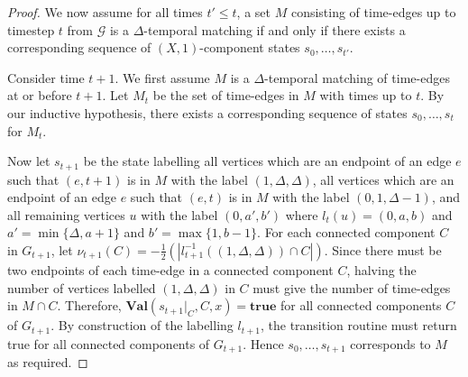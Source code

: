 \documentclass[a4paper,UKenglish,cleveref, autoref, thm-restate]{lipics-v2021} %
\begin{document}
\begin{toappendix}
\begin{proof}
    We now assume for all times $t'\leq t$, a set $M$ consisting of time-edges up to timestep $t$ from $\mathcal{G}$ is a $\Delta$-temporal matching if and only if there exists a corresponding sequence of $(X,1)$-component states $s_0, \ldots, s_{t'}$.

    Consider time $t+1$. We first assume $M$ is a $\Delta$-temporal matching of time-edges at or before $t+1$. Let $M_{t}$ be the set of time-edges in $M$ with times up to $t$. By our inductive hypothesis, there exists a corresponding sequence of states $s_0,\ldots,s_t$ for $M_t$.
    
    Now let $s_{t+1}$ be the state labelling all vertices which are an endpoint of an edge $e$ such that $(e,t+1)$ is in $M$ with the label $(1,\Delta,\Delta)$, all vertices which are an endpoint of an edge $e$ such that $(e,t)$ is in $M$ with the label $(0,1,\Delta-1)$, and all remaining vertices $u$ with the label $(0,a',b')$ where $l_t(u)=(0,a,b)$ and $a'=\min\{\Delta,a+1\}$ and $b'=\max\{1,b-1\}$. For each connected component $C$ in $G_{t+1}$, let $\nu_{t+1}(C)=-\frac{1}{2}(|l_{t+1}^{-1}((1,\Delta,\Delta))\cap C|)$. 
    Since there must be two endpoints of each time-edge in a connected component $C$, halving the number of vertices labelled $(1,\Delta,\Delta)$ in $C$ must give the number of time-edges in $M\cap C$. Therefore, $\textbf{Val}(s_{t+1}|_C,C,x)=\textbf{true}$ for all connected components $C$ of $G_{t+1}$. By construction of the labelling $l_{t+1}$, the transition routine must return true for all connected components of $G_{t+1}$. Hence $s_0,\ldots,s_{t+1}$ corresponds to $M$ as required.


\end{proof}
\end{toappendix}
\end{document}
